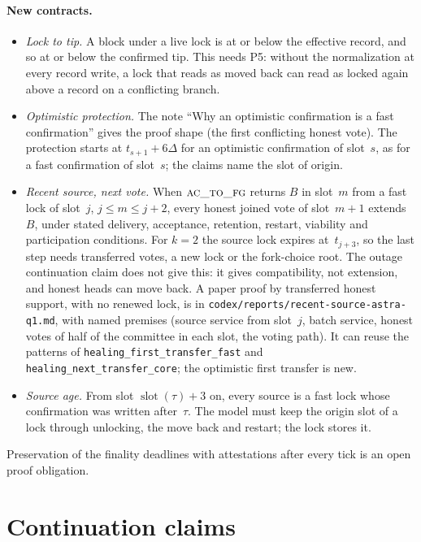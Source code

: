 \documentclass{article}
\newcommand{\slot}{\operatorname{slot}}
\newcommand{\fname}[1]{\text{\textsc{#1}}}
\begin{document}
\paragraph{New contracts.}
\begin{itemize}
\item \emph{Lock to tip.}  A block under a live lock is at or below the
  effective record, and so at or below the confirmed tip.  This needs P5:
  without the normalization at every record write, a lock that reads as
  moved back can read as locked again above a record on a conflicting
  branch.
\item \emph{Optimistic protection.}  The note ``Why an optimistic
  confirmation is a fast confirmation'' gives the proof shape (the first
  conflicting honest vote).  The protection starts at
  $t_{s+1}+6\Delta$ for an optimistic confirmation of slot~$s$, as for a
  fast confirmation of slot~$s$; the claims name the slot of origin.
\item \emph{Recent source, next vote.}  When $\fname{ac\_to\_fg}$ returns
  $B$ in slot~$m$ from a fast lock of slot~$j$, $j\leq m\leq j+2$, every
  honest joined vote of slot~$m+1$ extends~$B$, under stated delivery,
  acceptance, retention, restart, viability and participation
  conditions.  For $k=2$ the source lock expires at~$t_{j+3}$, so the last
  step needs transferred votes, a new lock or the fork-choice root.  The
  outage continuation claim does not give this: it gives compatibility,
  not extension, and honest heads can move back.  A paper proof by
  transferred honest support, with no renewed lock, is in
  \nolinkurl{codex/reports/recent-source-astra-q1.md}, with named
  premises (source service from slot~$j$, batch service, honest votes of
  half of the committee in each slot, the voting path).  It can reuse the
  patterns of \texttt{healing\_first\_transfer\_fast} and
  \texttt{healing\_next\_transfer\_core}; the optimistic first transfer is
  new.
\item \emph{Source age.}  From slot $\slot(\tau)+3$ on, every source is a
  fast lock whose confirmation was written after~$\tau$.  The model must
  keep the origin slot of a lock through unlocking, the move back and
  restart; the lock stores it.
\end{itemize}
Preservation of the finality deadlines with attestations after every tick
is an open proof obligation.

\section{Continuation claims}\label{sec:continuation-claims}
\end{document}
